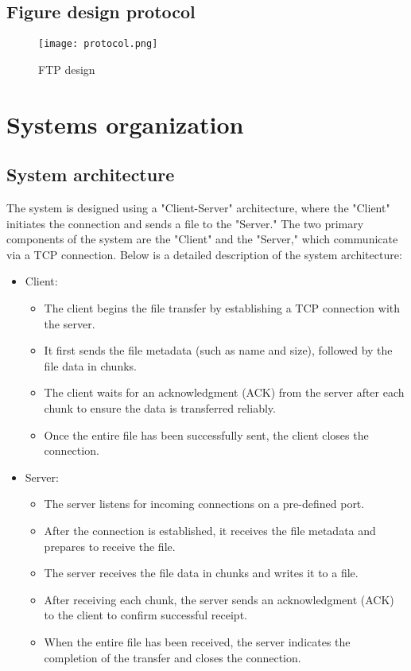 \documentclass{article}
\begin{document}
\thispagestyle{empty}
    \newpage

\subsection{Figure design protocol}
\begin{figure}[ht!]
    \centering
    \texttt{[image: protocol.png]}
    \caption{FTP design}
    \label{fig:ftp_des}
\end{figure}

\section{Systems organization}

\subsection{System architecture}
The system is designed using a "Client-Server" architecture, where the "Client" initiates the connection and sends a file to the "Server." The two primary components of the system are the "Client" and the "Server," which communicate via a TCP connection. Below is a detailed description of the system architecture:

\begin{itemize}
    \item Client: \begin{itemize}
        \item The client begins the file transfer by establishing a TCP connection with the server.
        \item It first sends the file metadata (such as name and size), followed by the file data in chunks.
        \item The client waits for an acknowledgment (ACK) from the server after each chunk to ensure the data is transferred reliably.
        \item Once the entire file has been successfully sent, the client closes the connection.
    \end{itemize}

    \item Server: \begin{itemize}
        \item The server listens for incoming connections on a pre-defined port.
        \item After the connection is established, it receives the file metadata and prepares to receive the file.
        \item The server receives the file data in chunks and writes it to a file.
        \item After receiving each chunk, the server sends an acknowledgment (ACK) to the client to confirm successful receipt.
        \item When the entire file has been received, the server indicates the completion of the transfer and closes the connection.
    \end{itemize}
\end{itemize}
\end{document}
